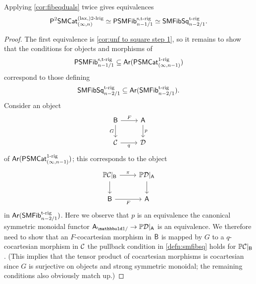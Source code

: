 \documentclass[a4paper,11pt]{article}
\begin{document}
\begin{propn}\label{propn:P2SMCat2lrig to square}
  Applying \cref{cor:fibeqduals} twice gives equivalences
  \[ \PSMCatIn[2]^{(\lax,)2\dlrig} \simeq \PSMFibstrig_{n-1/1}
    \simeq \SMFibSqtrig_{n-2/1}.\]
\end{propn}
\begin{proof}
  The first equivalence is \cref{cor:unf to square step 1}, so
  it remains to show that the conditions for
  objects and morphisms of \[\PSMFibstrig_{n-1/1} \subseteq
  \Ar(\PSMCat_{(\infty,n-1)}^{\orig})\] correspond to those defining
  \[\SMFibSqtrig_{n-2/1} \subseteq \Ar(\SMFib_{n-2/1}^{\trig}).\]
  Consider an object
  \begin{equation}
    \label{eq:ob of ar psmcat}
    \begin{tikzcd}
      \oB \ar[r, "F"] \ar[d, "G"'] & \oA  \ar[d, "p"] \\
      \nC \ar[r, "q"'] & \nD
    \end{tikzcd}
  \end{equation}
  of $\Ar(\PSMCat_{(\infty,n-1)}^{\orig})$; this corresponds to the object
  \begin{equation}
    \label{eq:ob of ar smfib}
    \begin{tikzcd}
      \mP\nC|_{\oB} \ar[r, "\pi"] \ar[d] & \mP\nD|_{\oA}  \ar[d] \\
      \oB \ar[r, "F"'] & \oA
    \end{tikzcd}
  \end{equation}
  in $\Ar(\SMFib_{n-2/1}^{\trig})$. Here we observe that $p$ is an
  equivalence \IFF{} the canonical symmetric monoidal functor
  $\oA_{\bbone/} \to \mP\nD|_{\oA}$ is an equivalence. We therefore
  need to show that an $F$-cocartesian morphism in $\oB$ is mapped by
  $G$ to a $q$-cocartesian morphism in $\nC$ \IFF{} the pullback
  condition in \cref{defn:smfibsq} holds for $\mP\nC|_{\oB}$. (This
  implies that the tensor product of cocartesian morphisms is
  cocartesian since $G$ is surjective on objects and strong symmetric
  monoidal; the remaining conditions also obviously match up.)


\end{proof}
\end{document}
